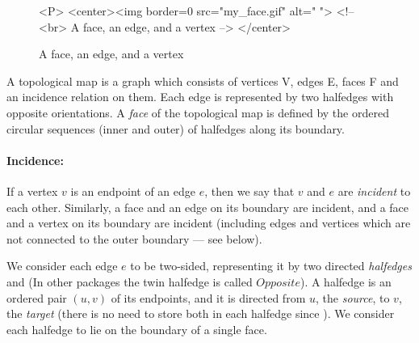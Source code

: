 \begin{figure}
\begin{ccTexOnly}
    \centerline{
    }
\end{ccTexOnly}
\caption{A face, an edge, and a vertex \label{fig:face}}

\begin{ccHtmlOnly}
  <P>
  <center><img border=0 src="my_face.gif" alt=" ">
  <!-- <br> A face, an edge, and a vertex -->
  </center>
\end{ccHtmlOnly}

\end{figure}

A topological map is a graph which consists of vertices V,
edges E, faces F and an incidence relation on them. %
Each edge is represented by two halfedges with opposite orientations.
A {\em face} of the topological map is defined by the ordered
circular sequences 
(inner and outer) of halfedges along its boundary. 

\paragraph{Incidence:}
If a vertex $v$ is an endpoint of an edge $e$, then we say that $v$
and $e$ are {\em incident} to each other. Similarly, a face and an
edge on its boundary are incident, and a face and a vertex on its
boundary are incident (including edges and vertices which are not connected 
to the outer boundary --- see below).

We consider each edge $e$ to be two-sided, representing it by two
directed {\em halfedges}  and 
(In other packages the twin halfedge is called $Opposite$).  
A halfedge  is an ordered pair $(u,v)$ of its endpoints, and
it is directed from $u$, the {\em source}, to $v$, the {\em target} (there 
is no need to store both in each halfedge since 
%
).
We consider each halfedge to lie on the boundary of a single face.

